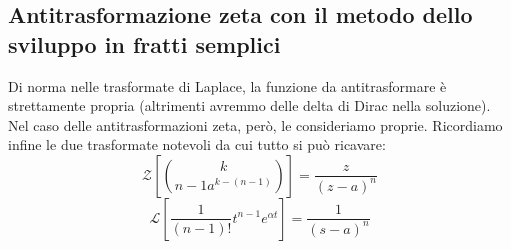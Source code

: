 \documentclass[11pt]{article}
\newcommand{\trz}{\mathcal{Z}}
\begin{document}
\subsection{Antitrasformazione zeta con il metodo dello sviluppo in fratti semplici}
Di norma nelle trasformate di Laplace, la funzione da antitrasformare è strettamente propria (altrimenti avremmo delle delta di Dirac nella soluzione). Nel caso delle antitrasformazioni zeta, però, le consideriamo proprie.
Ricordiamo infine le due trasformate notevoli da cui tutto si può ricavare:
\begin{displaymath}
    \trz\left[{k}\choose{n-1}a^{k-(n-1)}\right] = \frac{z}{(z-a)^n}
\end{displaymath}
\begin{displaymath}
    \mathcal{L}\left[\frac{1}{(n-1)!}t^{n-1}e^{\alpha t}\right] = \frac{1}{(s-a)^n}
\end{displaymath}
\end{document}
